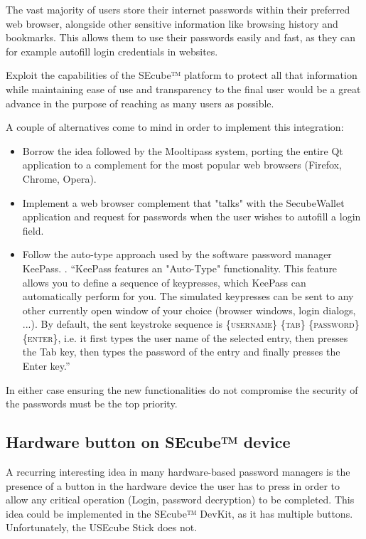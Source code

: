 The vast majority of users store their internet passwords within their preferred web browser, alongside other sensitive information like browsing history and bookmarks. This allows them to use their passwords easily and fast, as they can for example autofill login credentials in websites.

Exploit the capabilities of the SEcube™ platform to protect all that information while maintaining ease of use and transparency to the final user would be a great advance in the purpose of reaching as many users as possible.

A couple of alternatives come to mind in order to implement this integration:
\begin{itemize}
\setlength\itemsep{-3pt}

\item Borrow the idea followed by the Mooltipass system, porting the entire Qt application to a complement for the most popular web browsers (Firefox, Chrome, Opera).
\item Implement a web browser complement that "talks" with the SecubeWallet application and request for passwords when the user wishes to autofill a login field.
\item Follow the auto-type approach used by the software password manager KeePass. \cite{autotype}. ``KeePass features an "Auto-Type" functionality. This feature allows you to define a sequence of keypresses, which KeePass can automatically perform for you. The simulated keypresses can be sent to any other currently open window of your choice (browser windows, login dialogs, ...). By default, the sent keystroke sequence is \{\textsc{username}\} \{\textsc{tab}\} \{\textsc{password}\} \{\textsc{enter}\}, i.e. it first types the user name of the selected entry, then presses the Tab key, then types the password of the entry and finally presses the Enter key.''
\end{itemize}

In either case ensuring the new functionalities do not compromise the security of the passwords must be the top priority.

\subsection{Hardware button on SEcube™ device}
A recurring interesting idea in many hardware-based password managers is the presence of a button in the hardware device the user has to press in order to allow any critical operation (Login, password decryption) to be completed. This idea could be implemented in the SEcube™ DevKit, as it has multiple buttons. Unfortunately, the USEcube Stick does not.

